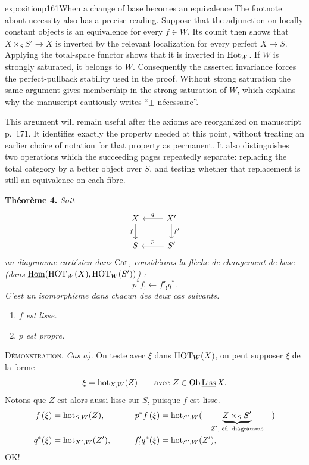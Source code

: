 \begin{dcomment}{exposition}{p161}{When a change of base becomes an equivalence}
The footnote about necessity also has a precise reading. Suppose that the adjunction on locally constant objects is an equivalence for every $f\in W$. Its counit then shows that $X\times_S S'\to X$ is inverted by the relevant localization for every perfect $X\to S$. Applying the total-space functor shows that it is inverted in $\mathrm{Hot}_W$. If $W$ is strongly saturated, it belongs to $W$. Consequently the asserted invariance forces the perfect-pullback stability used in the proof. Without strong saturation the same argument gives membership in the strong saturation of $W$, which explains why the manuscript cautiously writes ``$\pm$ n\'ecessaire''.

This argument will remain useful after the axioms are reorganized on manuscript p.~171. It identifies exactly the property needed at this point, without treating an earlier choice of notation for that property as permanent. It also distinguishes two operations which the succeeding pages repeatedly separate: replacing the total category by a better object over $S$, and testing whether that replacement is still an equivalence on each fibre.
\end{dcomment}


\noindent\textbf{Théorème 4.} \textit{Soit}
\[
\begin{tikzcd}
X \arrow[d, "f"'] & X' \arrow[l, "q"'] \arrow[d, "f'"] \\
S & S' \arrow[l, "p"']
\end{tikzcd}
\]
\textit{un diagramme cartésien dans} $\mathrm{Cat}$\textit{, considérons la flèche de changement de base (dans} $\underline{\mathrm{Hom}}(\mathrm{HOT}_W(X), \mathrm{HOT}_W(S'))$\textit{) :}
\[
p^* f_! \longleftarrow f'_! q^*.
\]
\textit{C'est un isomorphisme dans chacun des deux cas suivants.}

\begin{enumerate}
\item[\textit{a)}] \textit{$f$ est lisse.}
\item[\textit{b)}] \textit{$p$ est propre.}
\end{enumerate}

\textsc{Démonstration.} \textit{Cas a).} On teste avec $\xi$ dans $\mathrm{HOT}_W(X)$, on peut supposer $\xi$ de la forme
\[
\xi = \mathrm{hot}_{X,W}(Z) \qquad \text{avec } Z \in \mathrm{Ob}\, \underline{\mathrm{Liss}}\, X.
\]
Notons que $Z$ est alors aussi lisse sur $S$, puisque $f$ est lisse.
\[
\begin{aligned}
f_!(\xi) &= \mathrm{hot}_{S,W}(Z), &\qquad p^* f_!(\xi) &= \mathrm{hot}_{S',W}(\quad \underbrace{Z \times_S S'}_{\text{$Z'$, cf. diagramme}} \quad) \\
q^*(\xi) &= \mathrm{hot}_{X',W}(Z'), & f'_! q^*(\xi) &= \mathrm{hot}_{S',W}(Z'),
\end{aligned}
\]
OK!

